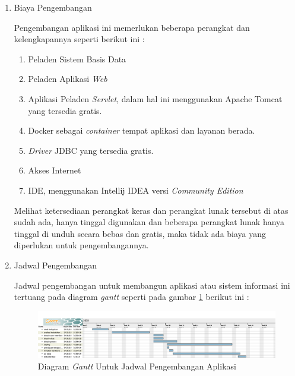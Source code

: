 \documentclass[pdftex,12pt, oneside]{article}
\begin{document}
\begin{enumerate}

\item Biaya Pengembangan

Pengembangan aplikasi ini memerlukan beberapa perangkat dan kelengkapannya seperti berikut ini :

\begin{enumerate}
	\item Peladen Sistem Basis Data
	\item Peladen Aplikasi \textit{Web} 
	\item Aplikasi Peladen \textit{Servlet}, dalam hal ini menggunakan Apache Tomcat yang tersedia gratis.
	\item Docker sebagai \textit{container} tempat aplikasi dan layanan berada.
	\item \textit{Driver} JDBC yang tersedia gratis.
	\item Akses Internet
	\item IDE, menggunakan Intellij IDEA versi \textit{Community Edition}
\end{enumerate}

Melihat ketersediaan perangkat keras dan perangkat lunak tersebut di atas sudah ada, hanya tinggal digunakan dan beberapa perangkat lunak hanya tinggal di unduh secara bebas dan gratis, maka tidak ada biaya yang diperlukan untuk pengembangannya.

\item Jadwal Pengembangan

Jadwal pengembangan untuk membangun aplikasi atau sistem informasi ini tertuang pada diagram \textit{gantt} seperti pada gambar \ref{fig:gantt-chart} berikut ini :

\begin{figure}[H]
	\centering
	\includegraphics[width=1\textwidth]{./resources/gantt-chart}
	\caption{Diagram \textit{Gantt} Untuk Jadwal Pengembangan Aplikasi}
	\label{fig:gantt-chart}
\end{figure}

\end{enumerate}
\end{document}
